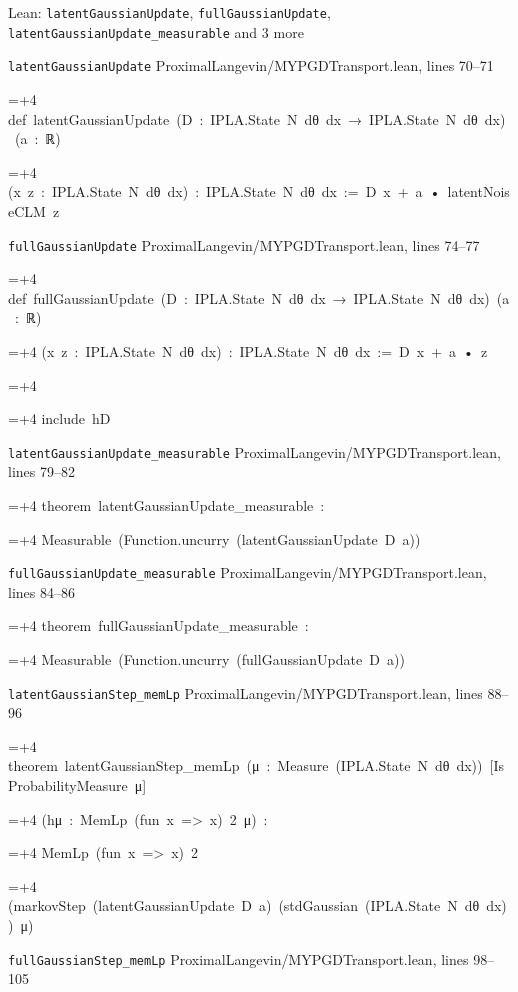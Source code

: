 \documentclass[11pt,a4paper]{article}
\newlength{\leancharwidth}
\newenvironment{leancode}{\par\smallskip\begingroup\ttfamily\footnotesize\raggedright
  \settowidth{\leancharwidth}{M}\setlength{\parskip}{0pt}\setlength{\parindent}{0pt}
  \frenchspacing}{\par\endgroup\smallskip}
\newcommand{\leanline}[2]{\hangindent=\dimexpr#1\leancharwidth+4\leancharwidth\relax
  \hangafter=1\noindent\hspace*{#1\leancharwidth}#2\par}
\newcommand{\leansource}[1]{\par{\footnotesize\color{leanmuted}#1}\par}
\begin{document}
\begin{leanbox}{Lean: \texttt{latentGaussianUpdate}, \texttt{fullGaussianUpdate}, \texttt{latentGaussianUpdate\_\allowbreak{}measurable} and 3 more}
\leansource{\texttt{latentGaussianUpdate} \quad ProximalLangevin/\allowbreak{}MYPGDTransport.lean, lines 70–71}
\begin{leancode}
\leanline{0}{def\ latentGaussianUpdate\ (D\ :\ IPLA.State\ N\ dθ\ dx\ →\ IPLA.State\ N\ dθ\ dx)\ (a\ :\ ℝ)}
\leanline{4}{(x\ z\ :\ IPLA.State\ N\ dθ\ dx)\ :\ IPLA.State\ N\ dθ\ dx\ :=\ D\ x\ +\ a\ •\ latentNoiseCLM\ z}
\end{leancode}
\leansource{\texttt{fullGaussianUpdate} \quad ProximalLangevin/\allowbreak{}MYPGDTransport.lean, lines 74–77}
\begin{leancode}
\leanline{0}{def\ fullGaussianUpdate\ (D\ :\ IPLA.State\ N\ dθ\ dx\ →\ IPLA.State\ N\ dθ\ dx)\ (a\ :\ ℝ)}
\leanline{4}{(x\ z\ :\ IPLA.State\ N\ dθ\ dx)\ :\ IPLA.State\ N\ dθ\ dx\ :=\ D\ x\ +\ a\ •\ z}
\leanline{0}{\strut}
\leanline{0}{include\ hD}
\end{leancode}
\leansource{\texttt{latentGaussianUpdate\_\allowbreak{}measurable} \quad ProximalLangevin/\allowbreak{}MYPGDTransport.lean, lines 79–82}
\begin{leancode}
\leanline{0}{theorem\ latentGaussianUpdate\_measurable\ :}
\leanline{4}{Measurable\ (Function.uncurry\ (latentGaussianUpdate\ D\ a))}
\end{leancode}
\leansource{\texttt{fullGaussianUpdate\_\allowbreak{}measurable} \quad ProximalLangevin/\allowbreak{}MYPGDTransport.lean, lines 84–86}
\begin{leancode}
\leanline{0}{theorem\ fullGaussianUpdate\_measurable\ :}
\leanline{4}{Measurable\ (Function.uncurry\ (fullGaussianUpdate\ D\ a))}
\end{leancode}
\leansource{\texttt{latentGaussianStep\_\allowbreak{}memLp} \quad ProximalLangevin/\allowbreak{}MYPGDTransport.lean, lines 88–96}
\begin{leancode}
\leanline{0}{theorem\ latentGaussianStep\_memLp\ (μ\ :\ Measure\ (IPLA.State\ N\ dθ\ dx))\ [IsProbabilityMeasure\ μ]}
\leanline{4}{(hμ\ :\ MemLp\ (fun\ x\ =>\ x)\ 2\ μ)\ :}
\leanline{4}{MemLp\ (fun\ x\ =>\ x)\ 2}
\leanline{6}{(markovStep\ (latentGaussianUpdate\ D\ a)\ (stdGaussian\ (IPLA.State\ N\ dθ\ dx))\ μ)}
\end{leancode}
\leansource{\texttt{fullGaussianStep\_\allowbreak{}memLp} \quad ProximalLangevin/\allowbreak{}MYPGDTransport.lean, lines 98–105}
\begin{leancode}

\end{leancode}
\end{leanbox}
\end{document}
